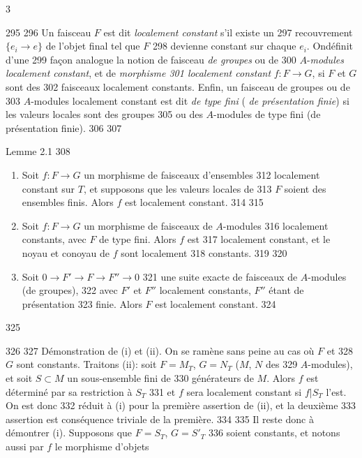 3	\documentclass[10pt]{../fichiers-configuration-latex/smfart}
\begin{document}
   295	
   296	Un faisceau $F$ est dit \emph{localement constant} s'il existe un
   297	recouvrement $\{e_i\rightarrow e\}$ de l'objet final tel que $F$
   298	devienne constant sur chaque $e_i$. On\pageoriginale définit d'une
   299	façon analogue la notion de faisceau \emph{de groupes} ou de
   300	$A$-\emph{modules localement constant}, et de \emph{morphisme
   301	  localement constant} $f:F\rightarrow G$, si $F$ et $G$ sont des
   302	faisceaux localement constants. Enfin, un faisceau de groupes ou de
   303	$A$-modules localement constant est dit \emph{de type fini} (	\emph{de présentation finie}) si les valeurs locales sont des groupes
   305	ou des $A$-modules de type fini (\resp de présentation finie).
   306	
   307	\begin{enonce*}{Lemme 2.1}
   308	\begin{enumerate}
   309	\renewcommand{\theenumi}{\roman{enumi}}
   310	\renewcommand{\labelenumi}{(\theenumi)}
   311	\item Soit $f:F\rightarrow G$ un morphisme de faisceaux d'ensembles
   312	  localement constant sur $T$, et supposons que les valeurs locales de
   313	  $F$ soient des ensembles finis. Alors $f$ est localement constant.
   314	
   315	\item Soit $f:F\rightarrow G$ un morphisme de faisceaux de $A$-modules
   316	  localement constants, avec $F$ de type fini. Alors $f$ est
   317	  localement constant, et le noyau et conoyau de $f$ sont localement
   318	  constants.
   319	
   320	\item Soit $0\rightarrow F'\rightarrow F\rightarrow F''\rightarrow 0$
   321	  une suite exacte de faisceaux de $A$-modules (\resp de groupes),
   322	  avec $F'$ et $F''$ localement constants, $F''$ étant de présentation
   323	  finie. Alors $F$ est localement constant.
   324	\end{enumerate}
   325	\end{enonce*}
   326	
   327	Démonstration de (i) et (ii). On se ramène sans peine au cas où $F$ et
   328	$G$ sont constants. Traitons (ii): soit $F=M_T$, $G=N_T$ ($M$, $N$ des
   329	$A$-modules), et soit $S\subset M$ un sous-ensemble fini de
   330	générateurs de $M$. Alors $f$ est déterminé par sa restriction à $S_T$
   331	et $f$ sera localement constant si $f|S_T$ l'est. On est donc
   332	réduit à (i) pour la première assertion de (ii), et la deuxième
   333	assertion est conséquence triviale de la première.
   334	
   335	Il reste donc à démontrer (i). Supposons que $F=S_T$, $G={S'}_T$
   336	soient constants, et notons aussi par $f$ le morphisme d'objets
\end{document}

